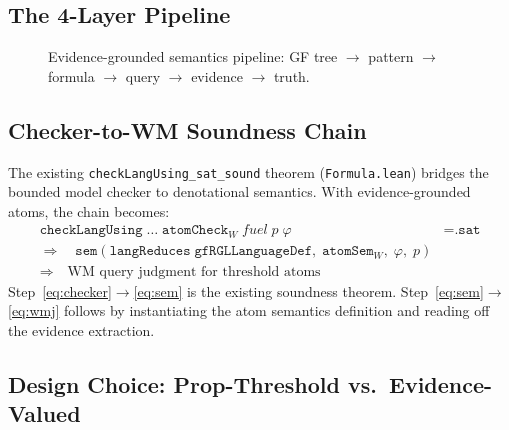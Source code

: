 \documentclass[11pt]{article}
\newcommand{\code}[1]{\texttt{#1}}
\newcommand{\GF}{\textup{GF}}
\begin{document}
\subsection{The 4-Layer Pipeline}

\begin{figure}[ht]
\centering
{}
\caption{Evidence-grounded semantics pipeline: \GF{} tree $\to$
  pattern $\to$ formula $\to$ query $\to$ evidence $\to$ truth.}
\label{fig:evidence-pipeline}
\end{figure}

\subsection{Checker-to-WM Soundness Chain}

The existing \code{checkLangUsing\_sat\_sound} theorem
(\code{Formula.lean}) bridges the bounded model checker to denotational
semantics.  With evidence-grounded atoms, the chain becomes:
\begin{align}
  \texttt{checkLangUsing}\;\ldots\; \texttt{atomCheck}_W\; \textit{fuel}\;
    p\; \varphi &= \texttt{.sat}
    \label{eq:checker} \\
  \Longrightarrow\quad
  \texttt{sem}(\texttt{langReduces}\;\texttt{gfRGLLanguageDef},\;
    \texttt{atomSem}_W,\; \varphi,\; p)
    \label{eq:sem} \\
  \Longrightarrow\quad
  \text{WM query judgment for threshold atoms}
    \label{eq:wmj}
\end{align}
Step~\eqref{eq:checker}$\to$\eqref{eq:sem} is the existing soundness
theorem.  Step~\eqref{eq:sem}$\to$\eqref{eq:wmj} follows by
instantiating the atom semantics definition and reading off the evidence
extraction.

\subsection{Design Choice: Prop-Threshold vs.\ Evidence-Valued}
\end{document}
